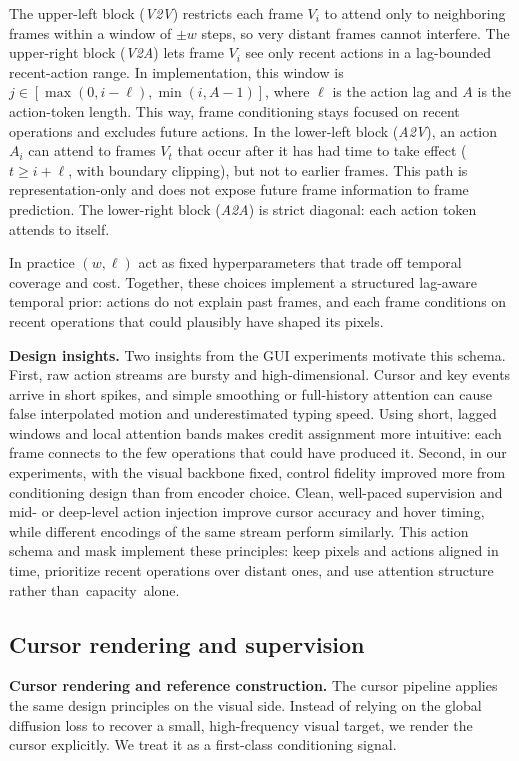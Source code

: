 The upper-left block (\emph{V2V}) restricts each frame $V_i$ to attend only to neighboring frames within a window of $\pm w$ steps, so very distant frames cannot interfere.
The upper-right block (\emph{V2A}) lets frame $V_i$ see only recent actions in a lag-bounded recent-action range.
In implementation, this window is $j \in [\max(0, i-\ell), \min(i, A-1)]$, where $\ell$ is the action lag and $A$ is the action-token length.
This way, frame conditioning stays focused on recent operations and excludes future actions.
In the lower-left block (\emph{A2V}), an action $A_i$ can attend to frames $V_t$ that occur after it has had time to take effect ($t \ge i+\ell$, with boundary clipping), but not to earlier frames.
This path is representation-only and does not expose future frame information to frame prediction.
The lower-right block (\emph{A2A}) is strict diagonal: each action token attends to itself.

In practice $(w,\ell)$ act as fixed hyperparameters that trade off temporal coverage and cost.
Together, these choices implement a structured lag-aware temporal prior: actions do not explain past frames, and each frame conditions on recent operations that could plausibly have shaped its pixels.

\noindent\textbf{Design insights.} Two insights from the GUI experiments motivate this schema.
First, raw action streams are bursty and high-dimensional.
Cursor and key events arrive in short spikes, and simple smoothing or full-history attention can cause false interpolated motion and underestimated typing speed.
Using short, lagged windows and local attention bands makes credit assignment more intuitive: each frame connects to the few operations that could have produced it.
Second, in our experiments, with the visual backbone fixed, control fidelity improved more from conditioning design than from encoder choice.
Clean, well-paced supervision and mid- or deep-level action injection improve cursor accuracy and hover timing, while different encodings of the same stream perform similarly.
This action schema and mask implement these principles: keep pixels and actions aligned in time, prioritize recent operations over distant ones, and use attention structure rather than~capacity~alone.

\subsection{Cursor rendering and supervision}
\noindent\textbf{Cursor rendering and reference construction.}
\label{appendix:cursor-rendering} 
%
The cursor pipeline applies the same design principles on the visual side.
Instead of relying on the global diffusion loss to recover a small, high-frequency visual target, we render the cursor explicitly.
We treat it as a first-class conditioning signal.

